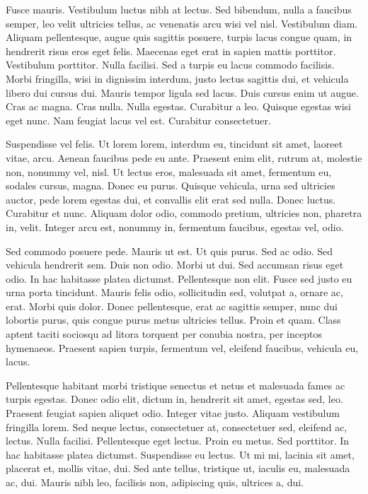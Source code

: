 %
{%
Fusce mauris. Vestibulum luctus nibh at lectus.  Sed bibendum, nulla
a faucibus semper, leo velit ultricies tellus, ac venenatis arcu
wisi vel nisl. Vestibulum diam. Aliquam pellentesque, augue quis
sagittis posuere, turpis lacus congue quam, in hendrerit risus eros
eget felis. Maecenas eget erat in sapien mattis porttitor.
Vestibulum porttitor. Nulla facilisi. Sed a turpis eu lacus commodo
facilisis. Morbi fringilla, wisi in dignissim interdum, justo lectus
sagittis dui, et vehicula libero dui cursus dui. Mauris tempor
ligula sed lacus. Duis cursus enim ut augue.  Cras ac magna. Cras
nulla. Nulla egestas. Curabitur a leo. Quisque egestas wisi eget
nunc. Nam feugiat lacus vel est. Curabitur consectetuer.%

Suspendisse vel felis. Ut lorem lorem, interdum eu, tincidunt sit
amet, laoreet vitae, arcu. Aenean faucibus pede eu ante. Praesent
enim elit, rutrum at, molestie non, nonummy vel, nisl. Ut lectus
eros, malesuada sit amet, fermentum eu, sodales cursus, magna. Donec
eu purus. Quisque vehicula, urna sed ultricies auctor, pede lorem
egestas dui, et convallis elit erat sed nulla.  Donec luctus.
Curabitur et nunc. Aliquam dolor odio, commodo pretium, ultricies
non, pharetra in, velit. Integer arcu est, nonummy in, fermentum
faucibus, egestas vel, odio.%
}

%
{%
Sed commodo posuere pede. Mauris ut est. Ut quis purus. Sed ac odio.
Sed vehicula hendrerit sem. Duis non odio.  Morbi ut dui. Sed
accumsan risus eget odio. In hac habitasse platea dictumst.
Pellentesque non elit. Fusce sed justo eu urna porta tincidunt.
Mauris felis odio, sollicitudin sed, volutpat a, ornare ac, erat.
Morbi quis dolor. Donec pellentesque, erat ac sagittis semper, nunc
dui lobortis purus, quis congue purus metus ultricies tellus. Proin
et quam. Class aptent taciti sociosqu ad litora torquent per conubia
nostra, per inceptos hymenaeos. Praesent sapien turpis, fermentum
vel, eleifend faucibus, vehicula eu, lacus.

Pellentesque habitant morbi tristique senectus et netus et malesuada
fames ac turpis egestas. Donec odio elit, dictum in, hendrerit sit
amet, egestas sed, leo. Praesent feugiat sapien aliquet odio.
Integer vitae justo. Aliquam vestibulum fringilla lorem. Sed neque
lectus, consectetuer at, consectetuer sed, eleifend ac, lectus.
Nulla facilisi. Pellentesque eget lectus.  Proin eu metus. Sed
porttitor. In hac habitasse platea dictumst.  Suspendisse eu lectus.
Ut mi mi, lacinia sit amet, placerat et, mollis vitae, dui. Sed ante
tellus, tristique ut, iaculis eu, malesuada ac, dui.  Mauris nibh
leo, facilisis non, adipiscing quis, ultrices a, dui.%
}

